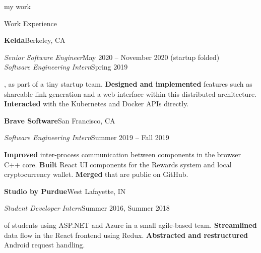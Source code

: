\begin{minipage}[t]{0.665\textwidth}
  {\Huge my work \phantom{me}}

  \vspace{10pt}

  {\sectionfont Work Experience}

  \vspace{5pt}
  \textbf{Kelda}\quad{}\hfill Berkeley, CA
  \begin{adjustwidth}{10pt}{}
    \emph{Senior Software Engineer}\hfill May 2020 -- November 2020 (startup folded)\\
    \emph{Software Engineering Intern}\hfill Spring 2019

    , as part of a tiny startup team.
    \textbf{Designed and implemented} features such as shareable link generation and a web interface within this distributed architecture.
    \textbf{Interacted} with the Kubernetes and Docker APIs directly.
  \end{adjustwidth}

  \vspace{5pt}
  \textbf{Brave Software}\quad{}\hfill San Francisco, CA
  \begin{adjustwidth}{10pt}{}
    \emph{Software Engineering Intern}\hfill Summer 2019 -- Fall 2019

    \textbf{Improved} inter-process communication between components in the browser C++ core.
    \textbf{Built} React UI components for the Rewards system and local cryptocurrency wallet.
    \textbf{Merged}  that are public on GitHub.
  \end{adjustwidth}

  \vspace{5pt}
  \textbf{Studio by Purdue}\hfill West Lafayette, IN
  \begin{adjustwidth}{10pt}{}
    \emph{Student Developer Intern}\hfill Summer 2016, Summer 2018

     of students using ASP.NET and Azure in a small agile-based team.
    \textbf{Streamlined} data flow in the React frontend using Redux.
    \textbf{Abstracted and restructured} Android request handling.
  \end{adjustwidth}


\end{minipage}
